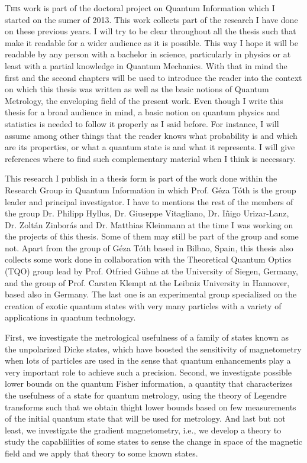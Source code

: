 \lettrine[lines=2, findent=3pt,nindent=0pt]{T}{his} work is part of the doctoral project on Quantum Information which I started on the sumer of 2013.
This work collects part of the research I have done on these previous years.
I will try to be clear throughout all the thesis such that make it readable for a wider audience as it is possible.
This way I hope it will be readable by any person with a bachelor in science, particularly in physics or at least with a partial knowledge in Quantum Mechanics.
With that in mind the first and the second chapters will be used to introduce the reader into the context on which this thesis was written as well as the basic notions of Quantum Metrology, the enveloping field of the present work.
Even though I write this thesis for a broad audience in mind, a basic notion on quantum physics and statistics is needed to follow it properly as I said before.
For instance, I will assume among other things that the reader knows what probability is and which are its properties, or what a quantum state is and what it represents.
I will give references where to find such complementary material when I think is necessary.

This research I publish in a thesis form is part of the work done within the Research Group in Quantum Information in which Prof.
G\'eza T\'oth is the group leader and principal investigator.
I have to mentions the rest of the members of the group Dr. Philipp Hyllus, Dr. Giuseppe Vitagliano, Dr. I\~nigo Urizar-Lanz, Dr. Zolt\'an Zinbor\'as and Dr. Matthias Kleinmann at the time I was working on the projects of this thesis.
Some of them may still be part of the group and some not.
Apart from the group of G\'eza T\'oth based in Bilbao, Spain, this thesis also collects some work done in collaboration with the Theoretical Quantum Optics (TQO) group lead by Prof. Otfried G\"uhne at the University of Siegen, Germany, and the group of Prof. Carsten Klempt at the Leibniz University in Hannover, based also in Germany.
The last one is an experimental group specialized on the creation of exotic quantum states with very many particles with a variety of applications in quantum technology.

First, we investigate the metrological usefulness of a family of states known as the unpolarized Dicke states, which have boosted the sensitivity of magnetometry when lots of particles are used in the sense that quantum enhancements play a very important role to achieve such a precision.
Second, we investigate possible lower bounds on the quantum Fisher information, a quantity that characterizes the usefulness of a state for quantum metrology, using the theory of Legendre transforms such that we obtain thight lower bounds based on few measurements of the initial quantum state that will be used for metrology.
And last but not least, we investigate the gradient magnetometry, i.e., we develop a theory to study the capablilities of some states to sense the change in space of the magnetic field and we apply that theory to some known states.

